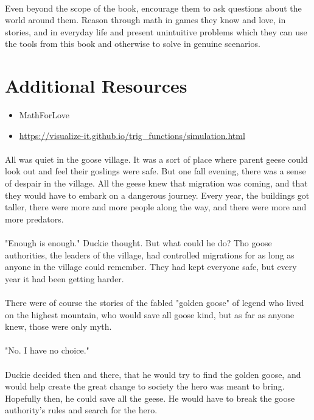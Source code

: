 \documentclass[a4paper,11pt ]{book}
\begin{document}
\paragraph{} Even beyond the scope of the book, encourage them to ask questions about the world around them. Reason through math in games they know and love, in stories, and in everyday life and present unintuitive problems which they can use the tools from this book and otherwise to solve in genuine scenarios. 
\section*{Additional Resources} 
\begin{itemize}
\item MathForLove
\item \url{https://visualize-it.github.io/trig_functions/simulation.html}
\end{itemize}
\tableofcontents
\vfill
\pagebreak
\paragraph{} All was quiet in the goose village. It was a sort of place where parent geese could look out and feel their goslings were safe. But one fall evening, there was a sense of despair in the village. All the geese knew that migration was coming, and that they would have to embark on a dangerous journey. Every year, the buildings got taller, there were more and more people along the way, and there were more and more predators. 
\paragraph{} "Enough is enough." Duckie thought. But what could he do? Tho goose authorities, the leaders of the village, had controlled migrations for as long as anyone in the village could remember. They had kept everyone safe, but every year it had been getting harder.
\paragraph{} There were of course the stories of the fabled "golden goose" of legend who lived on the highest mountain, who would save all goose kind, but as far as anyone knew, those were only myth.
\paragraph{} "No. I have no choice." 
\paragraph{} Duckie decided then and there, that he would try to find the golden goose, and would help create the great change to society the hero was meant to bring. Hopefully then, he could save all the geese. He would have to break the goose authority's rules and search for the hero.
\vfill
\pagebreak
\end{document}
